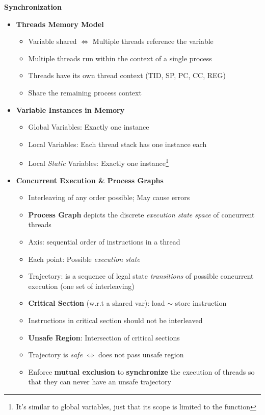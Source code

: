 \documentclass[12pt]{article}
\newcommand{\cname}[1]{\large \textbf{#1}}
\begin{document}
{\cname{Synchronization}
\begin{itemize}
	\item \textbf{Threads Memory Model}
	\begin{itemize}
		\item Variable shared $\iff$ Multiple threads reference the variable
		\item Multiple threads run within the context of a single process
		\item Threads have its own thread context (TID, SP, PC, CC, REG)
		\item Share the remaining process context
	\end{itemize}
	\item \textbf{Variable Instances in Memory}
	\begin{itemize}
		\item Global Variables: Exactly one instance
		\item Local Variables: Each thread stack has one instance each
		\item Local \textit{Static} Variables: Exactly one instance\footnote{It's similar to global variables, just that its scope is limited to the function}
	\end{itemize}
	\item \textbf{Concurrent Execution \& Process Graphs}
	\begin{itemize}
		\item Interleaving of any order possible; May cause errors
		\item \textbf{Process Graph} depicts the discrete \textit{execution state space} of concurrent threads
		\item Axis: sequential order of instructions in a thread
		\item Each point: Possible \textit{execution state}
		\item Trajectory: is a sequence of legal state \textit{transitions} of possible concurrent execution (one set of interleaving)
		\item \textbf{Critical Section} (w.r.t a shared var): load $\sim$ store instruction
		\item Instructions in critical section should not be interleaved
		\item \textbf{Unsafe Region}: Intersection of critical sections
		\item Trajectory is \textit{safe} $\iff$ does not pass unsafe region
		\item Enforce \textbf{mutual exclusion} to \textbf{synchronize} the execution of threads so that they can never have an unsafe trajectory

\end{itemize}
\end{itemize}}
\end{document}
